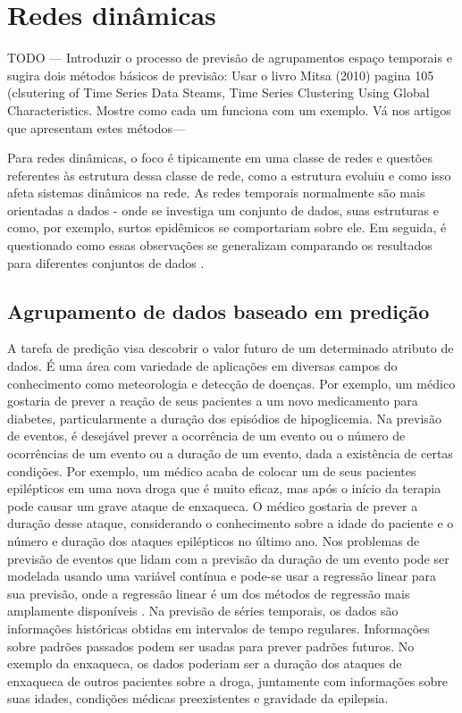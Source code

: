 \section{Redes dinâmicas}
 \label{chap:redes-dinamicas}
 
 TODO --- Introduzir o processo de previsão de agrupamentos espaço temporais e sugira dois métodos básicos de previsão: Usar o livro Mitsa (2010) pagina 105 (clsutering of Time Series Data Steams, Time Series Clustering Using Global Characteristics. Mostre como cada um funciona com um exemplo. Vá nos artigos que apresentam estes métodos---

 
 Para redes dinâmicas, o foco é tipicamente em uma classe de redes e questões referentes às estrutura dessa classe de rede, como a estrutura evoluiu e como isso afeta sistemas dinâmicos na rede. As redes temporais normalmente são mais orientadas a dados - onde se investiga um conjunto de dados, suas estruturas e como, por exemplo, surtos epidêmicos se comportariam sobre ele. Em seguida, é questionado como essas observações se generalizam comparando os resultados para diferentes conjuntos de dados \cite{holme:colloquium}.

\subsection{Agrupamento de dados baseado em predição}
A tarefa de predição visa descobrir o valor futuro de um determinado atributo de dados. É uma área com variedade de aplicações em diversas campos do conhecimento como meteorologia e detecção de doenças. Por exemplo, um médico gostaria de prever a reação de seus pacientes a um novo medicamento para diabetes, particularmente a duração dos episódios de hipoglicemia.
Na previsão de eventos, é desejável prever a ocorrência de um evento ou o número de ocorrências de um evento ou a duração de um evento, dada a existência de certas condições. Por exemplo, um médico acaba de colocar um de seus pacientes epilépticos em uma nova droga que é muito eficaz, mas após o início da terapia pode causar um grave ataque de enxaqueca. O médico gostaria de prever a duração desse ataque, considerando o conhecimento sobre a idade do paciente e o número e duração dos ataques epilépticos no último ano. Nos problemas de previsão de eventos que lidam com a previsão da duração de um evento pode ser modelada usando uma variável contínua e pode-se usar a regressão linear para sua previsão, onde a regressão linear é um dos métodos de regressão mais amplamente disponíveis \cite{Mitsa:2010}.
Na previsão de séries temporais, os dados são informações históricas obtidas em intervalos de tempo regulares. Informações sobre padrões passados podem ser usadas para prever padrões futuros. No exemplo da enxaqueca, os dados poderiam ser a duração dos ataques de enxaqueca de outros pacientes sobre a droga, juntamente com informações sobre suas idades, condições médicas preexistentes e gravidade da epilepsia.

